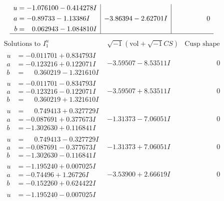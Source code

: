 \documentclass[1p]{elsarticle_modified}
\theoremstyle{definition}
\newcommand{\I}{\sqrt{-1}}
\begin{document}
$$\begin{array}{c|c|c}
\begin{aligned}
u &= -1.076100 - 0.414278 I \\
a &= -0.89733 - 1.13386 I \\
b &= \phantom{-}0.062943 - 1.084810 I\end{aligned}
 & -3.86394 - 2.62701 I & \phantom{-0.000000 } 0\\
 \hline 
 \end{array}$$\newpage$$\begin{array}{c|c|c}  
\text{Solutions to }I^u_{1}& \I (\text{vol} + \sqrt{-1}CS) & \text{Cusp shape}\\
 \hline 
\begin{aligned}
u &= -0.011701 + 0.834793 I \\
a &= -0.123216 + 0.122071 I \\
b &= \phantom{-}0.360219 - 1.321610 I\end{aligned}
 & -3.59507 - 8.53511 I & \phantom{-0.000000 } 0 \\ \hline\begin{aligned}
u &= -0.011701 - 0.834793 I \\
a &= -0.123216 - 0.122071 I \\
b &= \phantom{-}0.360219 + 1.321610 I\end{aligned}
 & -3.59507 + 8.53511 I & \phantom{-0.000000 } 0 \\ \hline\begin{aligned}
u &= \phantom{-}0.749413 + 0.327729 I \\
a &= -0.087691 + 0.377673 I \\
b &= -1.302630 + 0.116841 I\end{aligned}
 & -1.31373 - 7.06051 I & \phantom{-0.000000 } 0 \\ \hline\begin{aligned}
u &= \phantom{-}0.749413 - 0.327729 I \\
a &= -0.087691 - 0.377673 I \\
b &= -1.302630 - 0.116841 I\end{aligned}
 & -1.31373 + 7.06051 I & \phantom{-0.000000 } 0 \\ \hline\begin{aligned}
u &= -1.195240 + 0.007025 I \\
a &= -0.74496 + 1.26726 I \\
b &= -0.152260 + 0.624422 I\end{aligned}
 & -3.53900 + 2.66619 I & \phantom{-0.000000 } 0 \\ \hline\begin{aligned}
u &= -1.195240 - 0.007025 I \\

\end{aligned}
\end{array}$$
\end{document}

